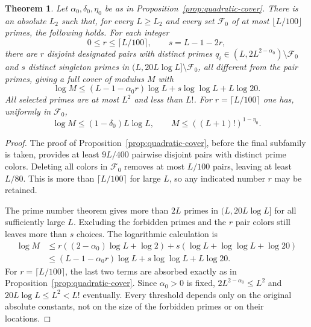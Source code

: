 \documentclass[11pt]{amsart}
\newtheorem{theorem}{Theorem}[section]
\theoremstyle{definition}
\theoremstyle{remark}
\begin{document}
\begin{theorem}\label{thm:robust}
Let $\alpha_0,\delta_0,\eta_0$ be as in
Proposition~\ref{prop:quadratic-cover}. There is an absolute $L_2$ such
that, for every $L\geq L_2$ and every set $\mathcal F_0$ of at most
$\lfloor L/100\rfloor$ primes, the following holds. For each integer
\[
0\leq r\leq\lceil L/100\rceil,\qquad s=L-1-2r,
\]
there are $r$ disjoint designated pairs with distinct primes
$q_i\in(L,2L^{2-\alpha_0})\setminus\mathcal F_0$ and $s$ distinct
singleton primes in $(L,20L\log L]\setminus\mathcal F_0$, all different
from the pair primes, giving a full cover of modulus $M$ with
\begin{equation}\label{eq:robustcost}
\log M\leq (L-1-\alpha_0r)\log L+s\log\log L+L\log20.
\end{equation}
All selected primes are at most $L^2$ and less than $L!$.
For $r=\lceil L/100\rceil$ one has, uniformly in $\mathcal F_0$,
\[
\log M\leq(1-\delta_0)L\log L,
\qquad M\leq((L+1)!)^{1-\eta_0}.
\]
\end{theorem}
\begin{proof}
The proof of Proposition~\ref{prop:quadratic-cover}, before the final
subfamily is taken, provides at least $9L/400$ pairwise disjoint
pairs with distinct prime colors. Deleting all colors in $\mathcal F_0$
removes at most $L/100$ pairs, leaving at least $L/80$.
This is more than $\lceil L/100\rceil$ for large $L$, so any indicated
number $r$ may be retained.

The prime number theorem gives more than $2L$ primes in
$(L,20L\log L]$ for all sufficiently large $L$. Excluding the forbidden
primes and the $r$ pair colors still leaves more than $s$ choices.
The logarithmic calculation is
\[
\begin{aligned}
\log M
&\leq r((2-\alpha_0)\log L+\log2)
+s(\log L+\log\log L+\log20)\\
&\leq(L-1-\alpha_0r)\log L+s\log\log L+L\log20.
\end{aligned}
\]
For $r=\lceil L/100\rceil$, the last two terms are absorbed exactly as
in Proposition~\ref{prop:quadratic-cover}. Since $\alpha_0>0$ is fixed,
$2L^{2-\alpha_0}\leq L^2$ and $20L\log L\leq L^2<L!$ eventually.
Every threshold depends only on the original absolute constants, not on
the size of the forbidden primes or on their locations.
\end{proof}
\end{document}
